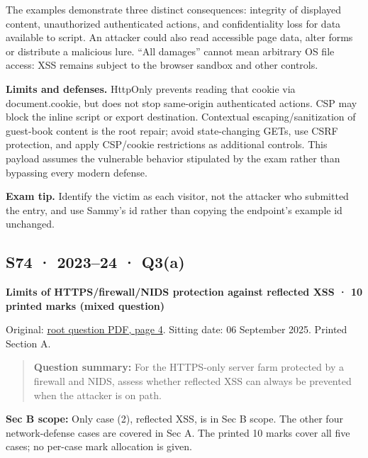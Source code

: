\documentclass[11pt,a4paper]{article}
\begin{document}
The examples demonstrate three distinct consequences: integrity of displayed content,\allowbreak{} unauthorized authenticated actions,\allowbreak{} and confidentiality loss for data available to script. An attacker could also read accessible page data,\allowbreak{} alter forms or distribute a malicious lure. “All damages” cannot mean arbitrary OS file access: XSS remains subject to the browser sandbox and other controls.


\textbf{Limits and defenses.} HttpOnly prevents reading that cookie via document.\allowbreak{}cookie,\allowbreak{} but does not stop same-origin authenticated actions. CSP may block the inline script or export destination. Contextual escaping/\allowbreak{}sanitization of guest-book content is the root repair; avoid state-changing GETs,\allowbreak{} use CSRF protection,\allowbreak{} and apply CSP/\allowbreak{}cookie restrictions as additional controls. This payload assumes the vulnerable behavior stipulated by the exam rather than bypassing every modern defense.



{\color{ForestGreen}\textbf{Exam tip.} Identify the victim as each visitor,\allowbreak{} not the attacker who submitted the entry,\allowbreak{} and use Sammy’s id rather than copying the endpoint’s example id unchanged.}




\clearpage
\subsection{S74 · 2023–24 · Q3(a)}\label{s74}

\textbf{Limits of HTTPS/\allowbreak{}firewall/\allowbreak{}NIDS protection against reflected XSS · 10 printed marks (mixed question)}


Original: \href{../../CSE405-Security_Merged.pdf\#page=4}{root question PDF,\allowbreak{} page 4}. Sitting date: 06 September 2025. Printed Section A.



\begin{quote}\small

\textbf{Question summary:} For the HTTPS-only server farm protected by a firewall and NIDS,\allowbreak{} assess whether reflected XSS can always be prevented when the attacker is on path.



\end{quote}

\textbf{Sec B scope:} Only case (2),\allowbreak{} reflected XSS,\allowbreak{} is in Sec B scope. The other four network-defense cases are covered in Sec A. The printed 10 marks cover all five cases; no per-case mark allocation is given.
\end{document}
